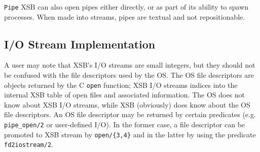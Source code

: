 \item {\tt Pipe} XSB can also open pipes either directly, or as part
of its ability to spawn processes.  When made into streams, pipes are
textual and not repositionable.
\ei

\subsection{I/O Stream Implementation} \label{sec:IO-streams}

A user may note that XSB's I/O streams are small integers, but they
should not be confused with the file descriptors used by the OS.  The
OS file descriptors are objects returned by the C {\tt open} function;
XSB I/O streams indices into the internal XSB table of open files and
associated information. The OS does not know about XSB I/O streams,
while XSB (obviously) does know about the OS file descriptors. An OS
file descriptor may be returned by certain predicates (e.g.  {\tt
pipe\_open/2} or user-defined I/O).  In the former case, a file
descriptor can be promoted to XSB stream by {\tt open/\{3,4\}} and in
the latter by using the predicate {\tt fd2iostream/2}.

